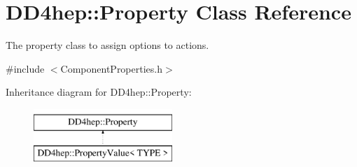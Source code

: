 \hypertarget{class_d_d4hep_1_1_property}{}\section{D\+D4hep\+:\+:Property Class Reference}
\label{class_d_d4hep_1_1_property}


The property class to assign options to actions.  




{\ttfamily \#include $<$Component\+Properties.\+h$>$}

Inheritance diagram for D\+D4hep\+:\+:Property\+:\begin{figure}[H]
\begin{center}
\leavevmode
\includegraphics[height=2.000000cm]{class_d_d4hep_1_1_property}
\end{center}
\end{figure}
